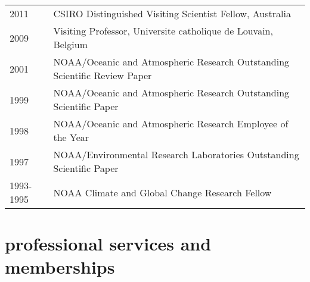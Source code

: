 \documentclass{article}
\begin{document}
\begin{tabular}{ll}
  2011 & CSIRO Distinguished Visiting Scientist Fellow, Australia \\
  2009 & Visiting Professor, Universite catholique de Louvain, Belgium\\
  2001 & NOAA/Oceanic and Atmospheric Research Outstanding Scientific
  Review Paper\\
  1999 & NOAA/Oceanic and Atmospheric Research Outstanding Scientific Paper\\
  1998 & NOAA/Oceanic and Atmospheric Research Employee of the Year\\
  1997 & NOAA/Environmental Research Laboratories Outstanding Scientific Paper\\
  1993-1995 & NOAA Climate and Global Change Research Fellow
\end{tabular}

\section*{\sc  \color{Maroon}  professional services and memberships}
\vspace{-.25cm}
\end{document}
